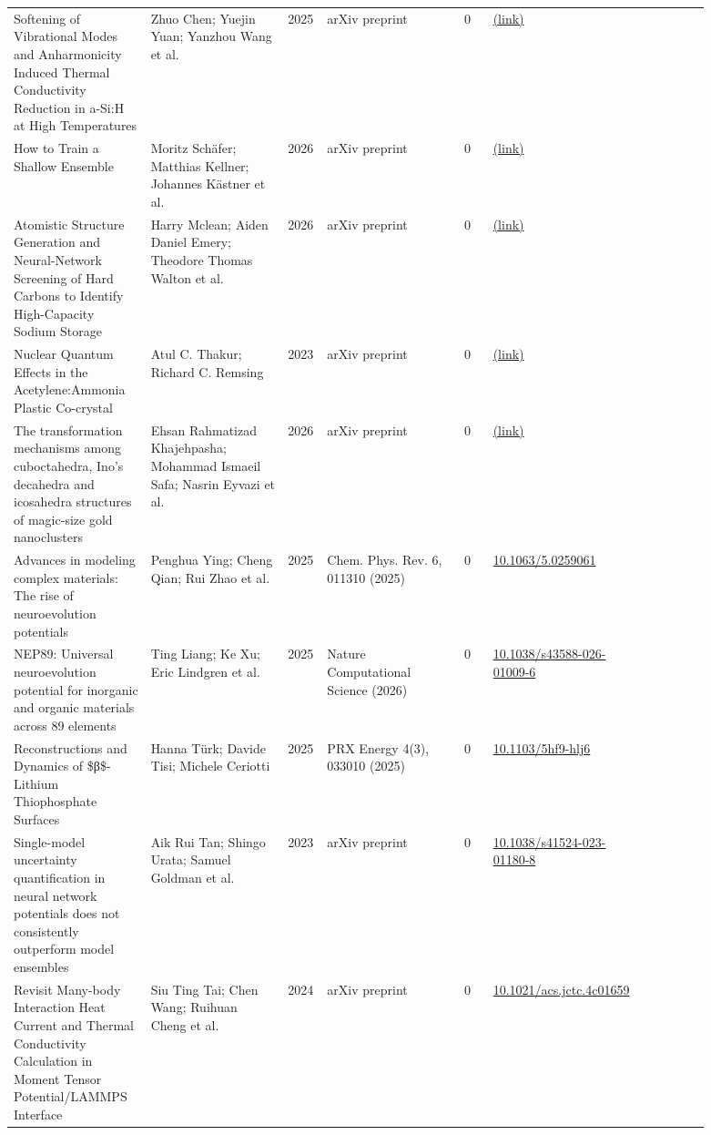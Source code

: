 \documentclass[10pt,a4paper]{article}
\begin{document}
{\begin{longtable}{p{0.192\linewidth}p{0.192\linewidth}p{0.043\linewidth}p{0.192\linewidth}p{0.043\linewidth}p{0.132\linewidth}p{0.096\linewidth}}
Softening of Vibrational Modes and Anharmonicity Induced Thermal Conductivity Reduction in a-Si:H at High Temperatures & Zhuo Chen; Yuejin Yuan; Yanzhou Wang et al. & 2025 & arXiv preprint & 0 & \href{http://arxiv.org/abs/2502.05584v2}{(link)} &  \\
How to Train a Shallow Ensemble & Moritz Schäfer; Matthias Kellner; Johannes Kästner et al. & 2026 & arXiv preprint & 0 & \href{http://arxiv.org/abs/2602.15747v1}{(link)} &  \\
Atomistic Structure Generation and Neural-Network Screening of Hard Carbons to Identify High-Capacity Sodium Storage & Harry Mclean; Aiden Daniel Emery; Theodore Thomas Walton et al. & 2026 & arXiv preprint & 0 & \href{http://arxiv.org/abs/2608.17716v1}{(link)} &  \\
Nuclear Quantum Effects in the Acetylene:Ammonia Plastic Co-crystal & Atul C. Thakur; Richard C. Remsing & 2023 & arXiv preprint & 0 & \href{http://arxiv.org/abs/2310.00480v1}{(link)} &  \\
The transformation mechanisms among cuboctahedra, Ino's decahedra and icosahedra structures of magic-size gold nanoclusters & Ehsan Rahmatizad Khajehpasha; Mohammad Ismaeil Safa; Nasrin Eyvazi et al. & 2026 & arXiv preprint & 0 & \href{http://arxiv.org/abs/2601.10434v1}{(link)} &  \\
Advances in modeling complex materials: The rise of neuroevolution potentials & Penghua Ying; Cheng Qian; Rui Zhao et al. & 2025 & Chem. Phys. Rev. 6, 011310 (2025) & 0 & \href{https://doi.org/10.1063/5.0259061}{10.1063/5.0259061} &  \\
NEP89: Universal neuroevolution potential for inorganic and organic materials across 89 elements & Ting Liang; Ke Xu; Eric Lindgren et al. & 2025 & Nature Computational Science (2026) & 0 & \href{https://doi.org/10.1038/s43588-026-01009-6}{10.1038/s43588-026-01009-6} &  \\
Reconstructions and Dynamics of \$β\$-Lithium Thiophosphate Surfaces & Hanna Türk; Davide Tisi; Michele Ceriotti & 2025 & PRX Energy 4(3), 033010 (2025) & 0 & \href{https://doi.org/10.1103/5hf9-hlj6}{10.1103/5hf9-hlj6} &  \\
Single-model uncertainty quantification in neural network potentials does not consistently outperform model ensembles & Aik Rui Tan; Shingo Urata; Samuel Goldman et al. & 2023 & arXiv preprint & 0 & \href{https://doi.org/10.1038/s41524-023-01180-8}{10.1038/s41524-023-01180-8} &  \\
Revisit Many-body Interaction Heat Current and Thermal Conductivity Calculation in Moment Tensor Potential/LAMMPS Interface & Siu Ting Tai; Chen Wang; Ruihuan Cheng et al. & 2024 & arXiv preprint & 0 & \href{https://doi.org/10.1021/acs.jctc.4c01659}{10.1021/acs.jctc.4c01659} &  \\

\end{longtable}}
\end{document}
